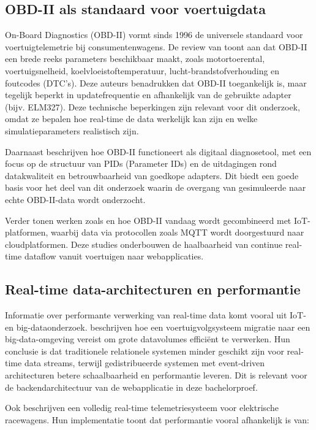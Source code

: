 \subsection{OBD-II als standaard voor voertuigdata}

On-Board Diagnostics (OBD-II) vormt sinds 1996 de universele standaard voor voertuigtelemetrie bij consumentenwagens. De review van \textcite{Michailidis2025} toont aan dat OBD-II een brede reeks parameters beschikbaar maakt, zoals motortoerental, voertuigsnelheid, koelvloeistoftemperatuur, lucht-brandstofverhouding en foutcodes (DTC’s). Deze auteurs benadrukken dat OBD-II toegankelijk is, maar tegelijk beperkt in updatefrequentie en afhankelijk van de gebruikte adapter (bijv. ELM327). Deze technische beperkingen zijn relevant voor dit onderzoek, omdat ze bepalen hoe real-time de data werkelijk kan zijn en welke simulatieparameters realistisch zijn.

Daarnaast beschrijven \textcite{Oluwaseyi2020} hoe OBD-II functioneert als digitaal diagnosetool, met een focus op de structuur van PIDs (Parameter IDs) en de uitdagingen rond datakwaliteit en betrouwbaarheid van goedkope adapters. Dit biedt een goede basis voor het deel van dit onderzoek waarin de overgang van gesimuleerde naar echte OBD-II-data wordt onderzocht.

Verder tonen werken zoals \textcite{Dabarera2022} en \textcite{Madushan2023} hoe OBD-II vandaag wordt gecombineerd met IoT-platformen, waarbij data via protocollen zoals MQTT wordt doorgestuurd naar cloudplatformen. Deze studies onderbouwen de haalbaarheid van continue real-time dataflow vanuit voertuigen naar webapplicaties.

\subsection{Real-time data-architecturen en performantie}

Informatie over performante verwerking van real-time data komt vooral uit IoT- en big-dataonderzoek. \textcite{Ferhat2024} beschrijven hoe een voertuigvolgsysteem migratie naar een big-data-omgeving vereist om grote datavolumes efficiënt te verwerken. Hun conclusie is dat traditionele relationele systemen minder geschikt zijn voor real-time data streams, terwijl gedistribueerde systemen met event-driven architecturen betere schaalbaarheid en performantie leveren. Dit is relevant voor de backendarchitectuur van de webapplicatie in deze bachelorproef.

Ook \textcite{Perez-Gonzalez2025} beschrijven een volledig real-time telemetriesysteem voor elektrische racewagens. Hun implementatie toont dat performantie vooral afhankelijk is van:

